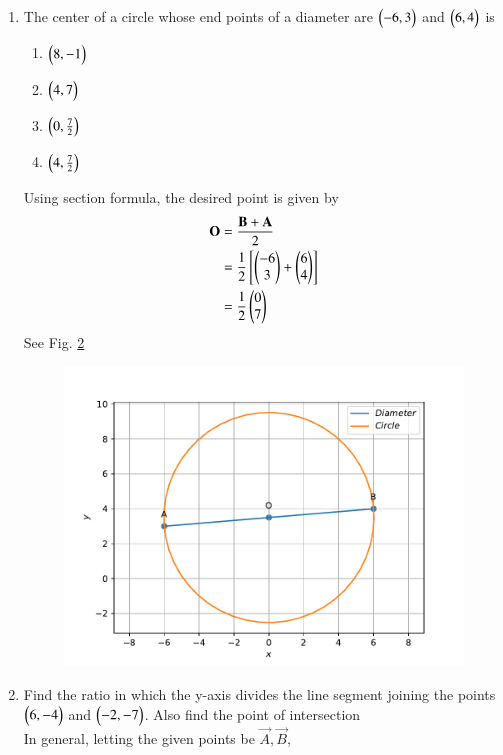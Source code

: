 \documentclass[journal,12pt,twocolumn]{IEEEtran}
\renewcommand\thesection{\arabic{section}}
\begin{document}
\begin{enumerate}[label=\thesection.\arabic*.,ref=\thesection.\theenumi]
\begin{figure}
	  \caption{}
	  \label{fig:matrix-10-2.pdf}
	  \end{figure}
\item The center of a circle whose end points of a diameter are $\begin{pmatrix}-6, 3\end{pmatrix}$ and $\begin{pmatrix}6,4\end{pmatrix}$ is
\begin{enumerate}
\item $\begin{pmatrix}8,-1\end{pmatrix}$
\item $\begin{pmatrix}4,7\end{pmatrix}$
\item $\begin{pmatrix}0,\frac{7}{2}\end{pmatrix}$
\item $\begin{pmatrix}4,\frac{7}{2}\end{pmatrix}$
\end{enumerate}
		\solution 
Using section formula, 
		the desired point is given by 
  \begin{align}
	  \mathbf{O}&= \frac{\mathbf{B}+ \mathbf{A}}{2}
	  \\
	  &= \frac{1}{2}{}\left[\begin{pmatrix} -6 \\ 3\end{pmatrix}+\begin{pmatrix}6 \\ 4\end{pmatrix}\right]
	  \\
	  &=\frac{1}{2}\begin{pmatrix}0 \\ 7\end{pmatrix}
  \end{align}
    See Fig. 
	  \ref{fig:matrix-10-3.pdf}
  \begin{figure}
	  \centering 
	  \includegraphics[width=\columnwidth]{figs/matrix-10-3.pdf}
	  \caption{}
	  \label{fig:matrix-10-3.pdf}
	  \end{figure}
        \item Find the ratio in which the y-axis divides the line segment joining the points $\begin{pmatrix}6, -4\end{pmatrix}$ and $\begin{pmatrix}-2, -7\end{pmatrix}$. Also find the point of intersection\\
\solution  In general, letting the given points be $\vec{A}, \vec{B}$, 

\end{enumerate}
\end{document}
